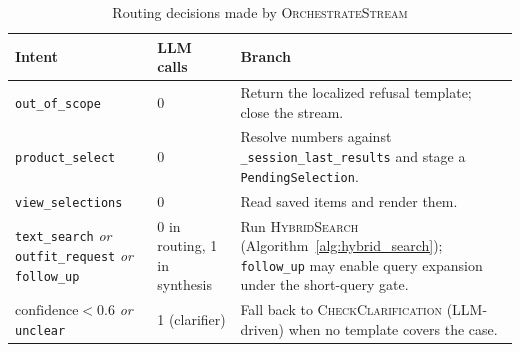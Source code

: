 \begin{table}[H]
\centering
\begin{tabular}{p{3.0cm}p{2.3cm}p{8.5cm}}
\toprule
\textbf{Intent} & \textbf{LLM calls} & \textbf{Branch}\\
\midrule
\texttt{out\_of\_scope}   & 0 & Return the localized refusal template; close the stream.\\
\texttt{product\_select}  & 0 & Resolve numbers against \texttt{\_session\_last\_results} and stage a \texttt{PendingSelection}.\\
\texttt{view\_selections} & 0 & Read saved items and render them.\\
\texttt{text\_search} \emph{or} \texttt{outfit\_request} \emph{or} \texttt{follow\_up} & 0 in routing, 1 in synthesis & Run \textsc{HybridSearch} (Algorithm~\ref{alg:hybrid_search}); \texttt{follow\_up} may enable query expansion under the short-query gate.\\
$\text{confidence} < 0.6$ \emph{or} \texttt{unclear} & 1 (clarifier) & Fall back to \textsc{CheckClarification} (LLM-driven) when no template covers the case.\\
\bottomrule
\end{tabular}
\caption{Routing decisions made by \textsc{OrchestrateStream}}
\label{tab:routing_decisions}
\end{table}


